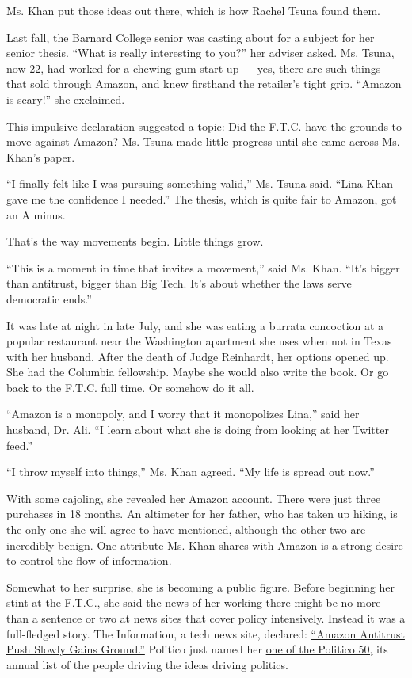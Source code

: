 Ms. Khan put those ideas out there, which is how Rachel Tsuna found
them.

Last fall, the Barnard College senior was casting about for a subject
for her senior thesis. ``What is really interesting to you?'' her
adviser asked. Ms. Tsuna, now 22, had worked for a chewing gum start-up
--- yes, there are such things --- that sold through Amazon, and knew
firsthand the retailer's tight grip. ``Amazon is scary!'' she exclaimed.

This impulsive declaration suggested a topic: Did the F.T.C. have the
grounds to move against Amazon? Ms. Tsuna made little progress until she
came across Ms. Khan's paper.

``I finally felt like I was pursuing something valid,'' Ms. Tsuna said.
``Lina Khan gave me the confidence I needed.'' The thesis, which is
quite fair to Amazon, got an A minus.

That's the way movements begin. Little things grow.

``This is a moment in time that invites a movement,'' said Ms. Khan.
``It's bigger than antitrust, bigger than Big Tech. It's about whether
the laws serve democratic ends.''

It was late at night in late July, and she was eating a burrata
concoction at a popular restaurant near the Washington apartment she
uses when not in Texas with her husband. After the death of Judge
Reinhardt, her options opened up. She had the Columbia fellowship. Maybe
she would also write the book. Or go back to the F.T.C. full time. Or
somehow do it all.

``Amazon is a monopoly, and I worry that it monopolizes Lina,'' said her
husband, Dr. Ali. ``I learn about what she is doing from looking at her
Twitter feed.''

``I throw myself into things,'' Ms. Khan agreed. ``My life is spread out
now.''

With some cajoling, she revealed her Amazon account. There were just
three purchases in 18 months. An altimeter for her father, who has taken
up hiking, is the only one she will agree to have mentioned, although
the other two are incredibly benign. One attribute Ms. Khan shares with
Amazon is a strong desire to control the flow of information.

Somewhat to her surprise, she is becoming a public figure. Before
beginning her stint at the F.T.C., she said the news of her working
there might be no more than a sentence or two at news sites that cover
policy intensively. Instead it was a full-fledged story. The
Information, a tech news site, declared:
\href{https://www.theinformation.com/articles/amazon-antitrust-push-slowly-gains-ground}{``Amazon
Antitrust Push Slowly Gains Ground.''} Politico just named her
\href{https://www.politico.com/interactives/2018/politico50/lina-khan/}{one
of the Politico 50,} its annual list of the people driving the ideas
driving politics.

